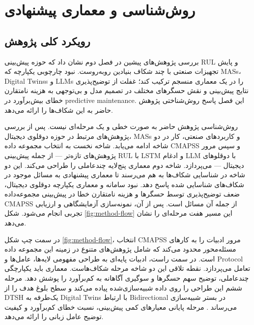 \chapter{روش‌شناسی و معماری پیشنهادی}\label{chap:methodology}


\section{رویکرد کلی پژوهش}\label{sec:method-approach}

بررسی پژوهش‌های پیشین در فصل دوم نشان داد که حوزه پیش‌بینی \gls{RUL} و پایش تجهیزات صنعتی با چند شکاف بنیادین روبه‌روست. نبود چارچوبی یکپارچه که \glspl{MAS}، \glspl{Digital Twins} و \glspl{LLM} را در یک معماری منسجم ترکیب کند؛ غفلت از توضیح‌پذیری نتایج پیش‌بینی و نقش حسگرهای مختلف در تصمیم مدل و بی‌توجهی به هزینه نامتقارن خطای بیش‌برآورد در \gls{predictive maintenance}. این فصل پاسخ روش‌شناختی پژوهش حاضر به این شکاف‌ها را ارائه می‌دهد.

روش‌شناسی پژوهش حاضر به صورت خطی و یک مرحله‌ای نیست. پس از بررسی پژوهش‌های مرتبط در حوزه دوقلوی دیجیتال، \glspl{MAS} و کاربردهای صنعتی، کار در دو شاخه ادامه می‌یابد. شاخه نخست به انتخاب مجموعه داده \gls{CMAPSS} و سپس مرور پژوهش‌های تازه‌تر --- از جمله پیش‌بینی \gls{RUL} با \gls{LSTM} و ادغام \gls{LLM} با دوقلوهای دیجیتال --- می‌پردازد. شاخه دوم معماری پنج‌لایه چندعاملی را طراحی می‌کند. این دو شاخه در شناسایی شکاف‌ها به هم می‌رسند تا معماری پیشنهادی به مسائل موجود در شکاف‌های شناسایی شده پاسخ دهد. نبود سامانه و معماری یکپارچه دوقلوی دیجیتال، ضعف توضیح‌پذیری توسط حسگر‌ها و هزینه نامتقارن خطا در پیش‌بینی مجموعه‌داده \gls{CMAPSS} از جمله آن مسائل است. پس از آن، نمونه‌سازی آزمایشگاهی و ارزیابی تجربی انجام می‌شود. شکل \ref{fig:method-flow} این مسیر هفت مرحله‌ای را نشان می‌دهد.


در سمت چپ شکل \ref{fig:method-flow}، انتخاب \gls{CMAPSS} مرور ادبیات را به کارهای مسئله‌محور محدود می‌کند که شامل پژوهش‌های متنوع در زمینه این مجموعه داده است. در سمت راست، ادبیات پایه‌ای به طراحی مفهومی لایه‌ها، عامل‌ها و \gls{Protocol} تعامل می‌پردازد. نقطه تلاقی این دو شاخه مرحله شکاف‌هاست. معماری باید یکپارچگی چندعاملی، توضیح سهم حسگرها و سوگیری آگاهانه به کم‌برآورد را پوشش دهد. مرحله ششم این طراحی را روی داده شبیه‌سازی‌شده پیاده می‌کند و سطح بلوغ هدف را از \gls{DTSH} یک‌طرفه به \gls{Digital Twins} با ارتباط \gls{Bidirectional} در بستر شبیه‌سازی می‌رساند \cite{tao2019digital}. مرحله پایانی معیارهای کمی پیش‌بینی، نسبت خطای کم‌برآورد و کیفیت توضیح عامل زبانی را ارائه می‌دهد.


